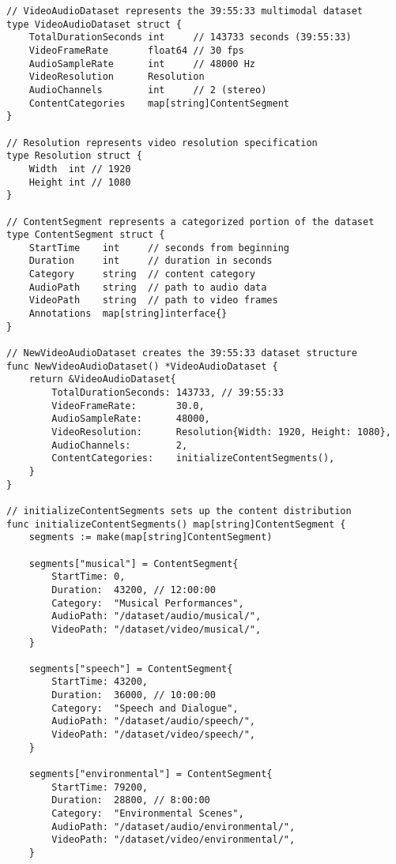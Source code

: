 \begin{tcolorbox}[colback=CodeBackground, colframe=DarkGray, title=Video-Audio Dataset Processing, fonttitle=\bfseries]
\begin{verbatim}
// VideoAudioDataset represents the 39:55:33 multimodal dataset
type VideoAudioDataset struct {
    TotalDurationSeconds int     // 143733 seconds (39:55:33)
    VideoFrameRate       float64 // 30 fps
    AudioSampleRate      int     // 48000 Hz
    VideoResolution      Resolution
    AudioChannels        int     // 2 (stereo)
    ContentCategories    map[string]ContentSegment
}

// Resolution represents video resolution specification
type Resolution struct {
    Width  int // 1920
    Height int // 1080
}

// ContentSegment represents a categorized portion of the dataset
type ContentSegment struct {
    StartTime    int     // seconds from beginning
    Duration     int     // duration in seconds
    Category     string  // content category
    AudioPath    string  // path to audio data
    VideoPath    string  // path to video frames
    Annotations  map[string]interface{}
}

// NewVideoAudioDataset creates the 39:55:33 dataset structure
func NewVideoAudioDataset() *VideoAudioDataset {
    return &VideoAudioDataset{
        TotalDurationSeconds: 143733, // 39:55:33
        VideoFrameRate:       30.0,
        AudioSampleRate:      48000,
        VideoResolution:      Resolution{Width: 1920, Height: 1080},
        AudioChannels:        2,
        ContentCategories:    initializeContentSegments(),
    }
}

// initializeContentSegments sets up the content distribution
func initializeContentSegments() map[string]ContentSegment {
    segments := make(map[string]ContentSegment)
    
    segments["musical"] = ContentSegment{
        StartTime: 0,
        Duration:  43200, // 12:00:00
        Category:  "Musical Performances",
        AudioPath: "/dataset/audio/musical/",
        VideoPath: "/dataset/video/musical/",
    }
    
    segments["speech"] = ContentSegment{
        StartTime: 43200,
        Duration:  36000, // 10:00:00
        Category:  "Speech and Dialogue",
        AudioPath: "/dataset/audio/speech/",
        VideoPath: "/dataset/video/speech/",
    }
    
    segments["environmental"] = ContentSegment{
        StartTime: 79200,
        Duration:  28800, // 8:00:00
        Category:  "Environmental Scenes",
        AudioPath: "/dataset/audio/environmental/",
        VideoPath: "/dataset/video/environmental/",
    }
    

\end{verbatim}
\end{tcolorbox}
